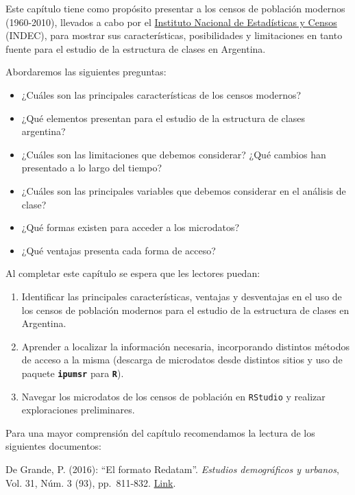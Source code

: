 \documentclass[
]{book}
\providecommand{\tightlist}{%
  \setlength{\itemsep}{0pt}\setlength{\parskip}{0pt}}
\begin{document}
Este capítulo tiene como propósito presentar a los censos de población modernos (1960-2010), llevados a cabo por el \href{www.indec.gob.ar}{Instituto Nacional de Estadísticas y Censos} (INDEC), para mostrar sus características, posibilidades y limitaciones en tanto fuente para el estudio de la estructura de clases en Argentina.

Abordaremos las siguientes preguntas:

\begin{itemize}
\tightlist
\item
  ¿Cuáles son las principales características de los censos modernos?
\item
  ¿Qué elementos presentan para el estudio de la estructura de clases argentina?
\item
  ¿Cuáles son las limitaciones que debemos considerar? ¿Qué cambios han presentado a lo largo del tiempo?
\item
  ¿Cuáles son las principales variables que debemos considerar en el análisis de clase?
\item
  ¿Qué formas existen para acceder a los microdatos?
\item
  ¿Qué ventajas presenta cada forma de acceso?
\end{itemize}

Al completar este capítulo se espera que les lectores puedan:

\begin{enumerate}
\def\labelenumi{\arabic{enumi}.}
\tightlist
\item
  Identificar las principales características, ventajas y desventajas en el uso de los censos de población modernos para el estudio de la estructura de clases en Argentina.
\item
  Aprender a localizar la información necesaria, incorporando distintos métodos de acceso a la misma (descarga de microdatos desde distintos sitios y uso de paquete \textbf{\texttt{ipumsr}} para \textbf{\texttt{R}}).
\item
  Navegar los microdatos de los censos de población en \texttt{RStudio} y realizar exploraciones preliminares.
\end{enumerate}

Para una mayor comprensión del capítulo recomendamos la lectura de los siguientes documentos:

De Grande, P. (2016): ``El formato Redatam''. \emph{Estudios demográficos y urbanos}, Vol. 31, Núm. 3 (93), pp.~811-832. \href{https://estudiosdemograficosyurbanos.colmex.mx/index.php/edu/article/view/15/pdf}{Link}.
\end{document}
